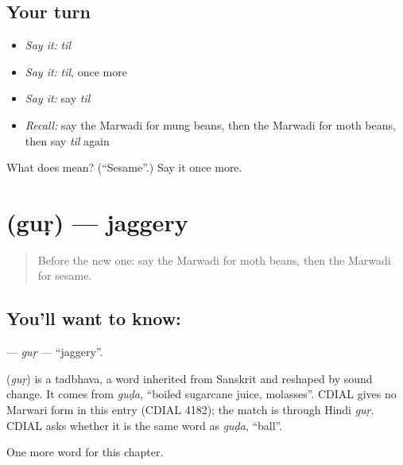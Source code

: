 \subsection*{Your turn}
\begin{itemize}
\raggedright
  \item \emph{Say it:} \emph{til}
  \item \emph{Say it:} \emph{til}, once more
  \item \emph{Say it:} say \emph{til}
  \item \emph{Recall:} say the Marwadi for mung beans, then the Marwadi for moth beans, then say \emph{til} again
\end{itemize}

\begin{tcolorbox}[breakable,colback=teal!4,colframe=teal!35!black,title={Before you move on}]
What does  mean? (\textquotedblleft{}Sesame\textquotedblright{}.) Say it once more.
\end{tcolorbox}
\section[\texorpdfstring{\mw{गुड़} (guṛ)}{गुड़ (guṛ)}]{ (guṛ) — jaggery}

\label{lesson:MW-C133-gur}



\begin{quote}
Before the new one: say the Marwadi for moth beans, then the Marwadi for sesame.
\end{quote}

\subsection*{You'll want to know: }
\textbf{} — \emph{guṛ} — \textquotedblleft{}jaggery\textquotedblright{}.

\begin{cousinweb}
\textbf{} (\emph{guṛ}) is a tadbhava, a word inherited from Sanskrit and reshaped by sound change. It comes from \emph{guḍa}, \textquotedblleft{}boiled sugarcane juice, molasses\textquotedblright{}. CDIAL gives no Marwari form in this entry (CDIAL 4182); the match is through Hindi \emph{guṛ}. CDIAL asks whether it is the same word as \emph{guḍa}, \textquotedblleft{}ball\textquotedblright{}.
\end{cousinweb}

\begin{grammarlens}[title={What you've built}]
One more word for this chapter.
\end{grammarlens}

